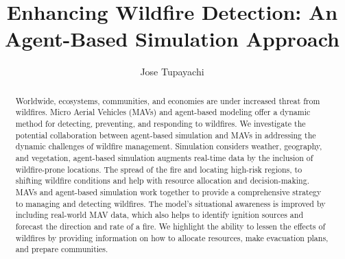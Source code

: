 \documentclass[preprint,review, 11pt,3p,authoryear]{elsarticle}
\begin{document}
\begin{frontmatter}
\title{Enhancing Wildfire Detection: An Agent-Based Simulation Approach}







\author[mymainaddress]{Jose Tupayachi}


\address[mymainaddress]{Department of Industrial and Systems Engineering, The University of Tennessee at Knoxville, Knoxville, TN 37996, US}


\doublespacing

\begin{abstract}
Worldwide, ecosystems, communities, and economies are under increased threat from wildfires. Micro Aerial Vehicles (MAVs) and agent-based modeling offer a dynamic method for detecting, preventing, and responding to wildfires. We investigate the potential collaboration between agent-based simulation and MAVs in addressing the dynamic challenges of wildfire management.
Simulation considers weather, geography, and vegetation, agent-based simulation augments real-time data by the inclusion of wildfire-prone locations. The spread of the fire and locating high-risk regions, to shifting wildfire conditions and help with resource allocation and decision-making. MAVs and agent-based simulation work together to provide a comprehensive strategy to managing and detecting wildfires. The model's situational awareness is improved by including real-world MAV data, which also helps to identify ignition sources and forecast the direction and rate of a fire. We highlight the ability to lessen the effects of wildfires by providing information on how to allocate resources, make evacuation plans, and prepare communities.


\end{abstract}
\end{frontmatter}
\end{document}
